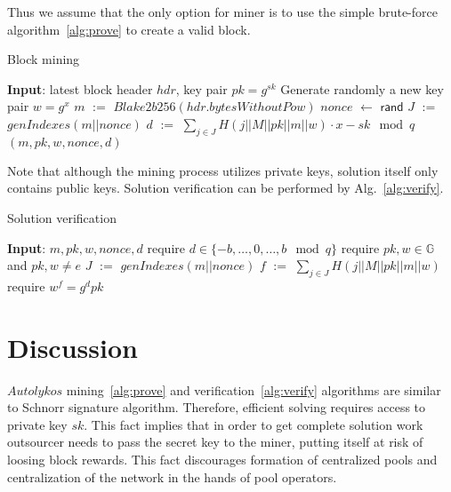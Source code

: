 \documentclass[]{article}
\newcommand{\Name}{$Autolykos$}
\def\Let#1#2{\State #1 $:=$ #2}
\def\LetRnd#1#2{\State #1 $\gets$ #2}
\begin{document}
    Thus we assume that the only option for miner is to use the simple brute-force algorithm~\ref{alg:prove} to
    create a valid block.

    \begin{algorithm}[H]
        \caption{Block mining}
        \label{alg:prove}
        \begin{algorithmic}[1]
            \State \textbf{Input}: latest block header $hdr$, key pair $pk=g^{sk}$
            \State Generate randomly a new key pair $w=g^x$
            \Let{$m$}{$Blake2b256(hdr.bytesWithoutPow)$}
            \LetRnd{$nonce$}{$\mathsf{rand}$}
            \Let{$J$}{$genIndexes(m||nonce)$}
            \Let{$d$}{$\sum_{j \in J}{H(j||M||pk||m||w)} \cdot x - sk \mod q$}
            \State \Return $(m,pk,w,nonce,d)$
            \EndIf
            \EndWhile
        \end{algorithmic}
    \end{algorithm}

    Note that although the mining process utilizes private keys, solution itself
    only contains public keys. Solution verification can be performed by Alg.~\ref{alg:verify}.

    \begin{algorithm}[H]
        \caption{Solution verification}
        \label{alg:verify}
        \begin{algorithmic}[1]
            \State \textbf{Input}: $m,pk,w,nonce,d$
            \State require $d\in\{-b,\dots,0,\dots, b\mod q\}$
            \State require $pk,w\in \mathbb{G}$ and $pk,w \ne e$
            \Let{$J$}{$genIndexes(m||nonce)$}
            \Let{$f$}{$\sum_{j \in J} H(j||M||pk||m||w)$}
            \State require $w^f = g^dpk$
        \end{algorithmic}
    \end{algorithm}

    \section{Discussion}
    \label{discussion}

    \Name{} mining~\ref{alg:prove} and verification~\ref{alg:verify} algorithms
    are similar to Schnorr signature algorithm. Therefore, efficient solving
    requires access to private key $sk$. This fact implies that in order to get
    complete solution work outsourcer needs to pass the secret key to the miner,
    putting itself at risk of loosing block rewards.
    This fact discourages formation of centralized pools and centralization of the network in the hands of pool operators.
\end{document}
